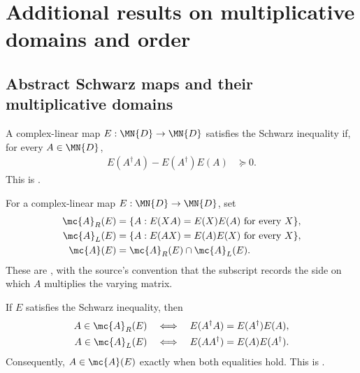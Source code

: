 \section{Additional results on multiplicative domains and order}

\subsection{Abstract Schwarz maps and their multiplicative domains}

\begin{definition}
    \label{def:abstract_schwarz_inequality}
    \leanok
    A complex-linear map $E:\MN{D}\to\MN{D}$ satisfies the Schwarz
    inequality if, for every $A\in\MN{D}$,
    \begin{align}
        E(A^\dagger A)-E(A^\dagger)E(A)
         & \succeq 0.
        \label{eq:schwarz_abstract_inequality}
    \end{align}
    This is \cite[Equation~(5.2)]{Wolf2012Quantum}.
\end{definition}

\begin{definition}
    \label{def:abstract_one_sided_multiplicative_domains}
    \leanok
    For a complex-linear map $E:\MN{D}\to\MN{D}$, set
    \begin{align}
        \mc{A}_R(E)
         & =\{A:E(XA)=E(X)E(A)\text{ for every }X\}, \notag \\
        \mc{A}_L(E)
         & =\{A:E(AX)=E(A)E(X)\text{ for every }X\}, \notag \\
        \mc{A}(E)
         & =\mc{A}_R(E)\cap\mc{A}_L(E).
        \notag
    \end{align}
    These are \cite[Equations~(5.11)--(5.12)]{Wolf2012Quantum}, with the
    source's convention that the subscript records the side on which $A$
    multiplies the varying matrix.
\end{definition}

\begin{theorem}
    \label{thm:abstract_md_characterization}
    \leanok
    If $E$ satisfies the Schwarz inequality, then
    \begin{align}
        A\in\mc{A}_R(E)
         & \quad\Longleftrightarrow\quad
        E(A^\dagger A)=E(A^\dagger)E(A), \notag \\
        A\in\mc{A}_L(E)
         & \quad\Longleftrightarrow\quad
        E(AA^\dagger)=E(A)E(A^\dagger).
        \notag
    \end{align}
    Consequently, $A\in\mc{A}(E)$ exactly when both equalities hold.
    This is \cite[Equations~(5.13)--(5.14)]{Wolf2012Quantum}.
\end{theorem}

